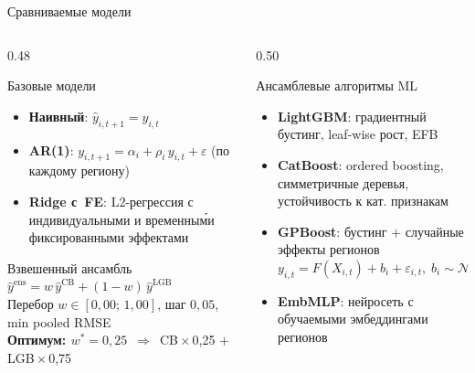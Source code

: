 \documentclass[aspectratio=169,10pt]{beamer}
\begin{document}
\begin{frame}{Сравниваемые модели}
\begin{columns}[T]
  \begin{column}{0.48\textwidth}
    \begin{block}{Базовые модели}
      \begin{itemize}
        \item \textbf{Наивный}: $\hat{y}_{i,t+1} = y_{i,t}$
        \item \textbf{AR(1)}: $y_{i,t+1} = \alpha_i + \rho_i\,y_{i,t} + \varepsilon$
              (по каждому региону)
        \item \textbf{Ridge с~FE}: L2-регрессия с индивидуальными
              и временны\'{м}и фиксированными эффектами
      \end{itemize}
    \end{block}
    \vspace{0.2em}
    \begin{block}{Взвешенный ансамбль}
      {\small
      $\hat{y}^{\text{ens}} = w\,\hat{y}^{\text{CB}} + (1-w)\,\hat{y}^{\text{LGB}}$\\[3pt]
      Перебор $w\in[0{,}00;\,1{,}00]$, шаг $0{,}05$, min pooled RMSE\\[3pt]
      \textbf{Оптимум: $w^*=0{,}25$}~$\Rightarrow$~CB$\!\times\!$0,25 + LGB$\!\times\!$0,75}
    \end{block}
  \end{column}
  \begin{column}{0.50\textwidth}
    \begin{block}{Ансамблевые алгоритмы ML}
      \begin{itemize}
        \item \textbf{LightGBM}: градиентный бустинг, leaf-wise рост, EFB
        \item \textbf{CatBoost}: ordered boosting, симметричные деревья,
              устойчивость к кат. признакам
        \item \textbf{GPBoost}: бустинг + случайные эффекты регионов\\[-2pt]
              {\small$y_{i,t} {=} F(X_{i,t}){+}b_i{+}\varepsilon_{i,t},\;
               b_i{\sim}\mathcal{N}(0,\sigma_b^2)$}
        \item \textbf{EmbMLP}: нейросеть с обучаемыми эмбеддингами регионов
      \end{itemize}
    \end{block}
  \end{column}
\end{columns}
\end{frame}
\end{document}
